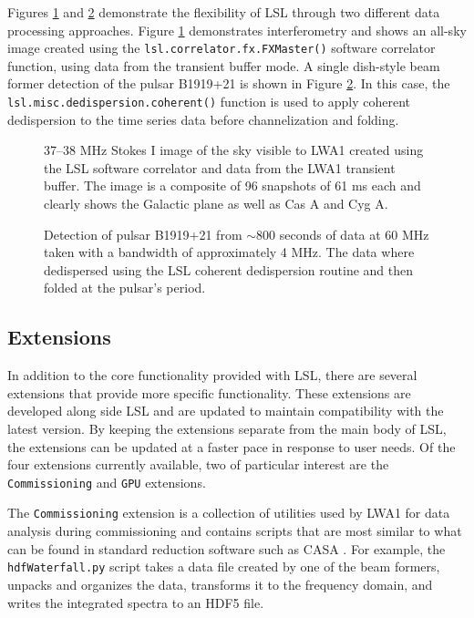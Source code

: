 Figures \ref{P42_fig:sky} and \ref{P42_fig:psr} demonstrate the flexibility of LSL through two different data processing approaches.  Figure \ref{P42_fig:sky} demonstrates interferometry and shows an all-sky image created using the {\tt lsl.correlator.fx.FXMaster()} software correlator function, using data from the transient buffer mode.  A single dish-style beam former detection of the pulsar B1919+21 is shown in Figure \ref{P42_fig:psr}.  In this case, the {\tt lsl.misc.dedispersion.coherent()} function is used to apply coherent dedispersion to the time series data before channelization and folding.

\begin{figure}
	\caption{\label{P42_fig:sky}37--38 MHz Stokes I image of the sky visible to LWA1 created using the LSL software correlator and data from the LWA1 transient buffer.  The image is a composite of 96 snapshots of 61 ms each and clearly shows the Galactic plane as well as Cas A and Cyg A.}
\end{figure}

\begin{figure}
	\caption{\label{P42_fig:psr}Detection of pulsar B1919+21 from $\sim$800 seconds of data at 60 MHz taken with a bandwidth of approximately 4 MHz.  The data where dedispersed using the LSL coherent dedispersion routine and then folded at the pulsar's period.}
\end{figure}

\subsection{Extensions}
In addition to the core functionality provided with LSL, there are several extensions that provide more specific functionality.  These extensions are developed along side LSL and  are updated to maintain compatibility with the latest version.  By keeping the extensions separate from the main body of LSL, the extensions can be updated at a faster pace in response to user needs.  Of the four extensions currently available, two of particular interest are the {\tt Commissioning} and {\tt {}GPU} extensions.

The {\tt Commissioning} extension is a collection of utilities used by LWA1 for data analysis during commissioning and contains scripts that are most similar to what can be found in standard reduction software such as CASA .  For example, the {\tt hdfWaterfall.py} script takes a data file created by one of the beam formers, unpacks and organizes the data, transforms it to the frequency domain, and writes the integrated spectra to an HDF5 file.  

